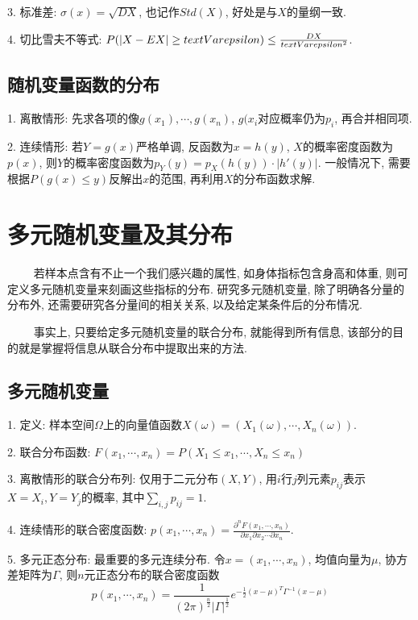 3. 标准差: $\sigma(x)=\sqrt{DX}$, 也记作$Std(X)$, 好处是与$X$的量纲一致.

4. 切比雪夫不等式: $P(|X-EX|\geq \\text{Var}epsilon)\leq \frac{DX}{\\text{Var}epsilon^2}$.

\subsection{随机变量函数的分布}

1. 离散情形: 先求各项的像$g(x_1),\cdots, g(x_n)$, $g(x_i$对应概率仍为$p_i$, 再合并相同项.

2. 连续情形: 若$Y=g(x)$严格单调, 反函数为$x=h(y)$, $X$的概率密度函数为$p(x)$, 则$Y$的概率密度函数为$p_Y(y)=p_X(h(y)) \cdot |h'(y)|$.
一般情况下, 需要根据$P(g(x)\leq y)$反解出$x$的范围, 再利用$X$的分布函数求解.

\section{多元随机变量及其分布}

\begin{tcolorbox}[colback=red!5,colframe=red!75!black]
    ~~~~ 若样本点含有不止一个我们感兴趣的属性, 如身体指标包含身高和体重, 则可定义多元随机变量来刻画这些指标的分布. 研究多元随机变量, 除了明确各分量的分布外, 还需要研究各分量间的相关关系, 以及给定某条件后的分布情况. 
    
    ~~~~ 事实上, 只要给定多元随机变量的联合分布, 就能得到所有信息, 该部分的目的就是掌握将信息从联合分布中提取出来的方法.
\end{tcolorbox}

\subsection{多元随机变量}

1. 定义: 样本空间$\Omega$上的向量值函数$X(\omega)=(X_1(\omega),\cdots,X_n(\omega))$.

2. 联合分布函数: $F(x_1,\cdots, x_n)=P(X_1\leq x_1, \cdots, X_n \leq x_n)$

3. 离散情形的联合分布列: 仅用于二元分布$(X,Y)$, 用$i$行$j$列元素$p_{ij}$表示$X=X_i,Y=Y_j$的概率, 其中$\sum\limits_{i,j}p_{ij}=1$.

4. 连续情形的联合密度函数: $p(x_1,\cdots, x_n)=\frac{\partial^nF(x_1,\cdots,x_n)}{\partial x_1\partial x_2 \cdots \partial x_n}$.

5. 多元正态分布: 最重要的多元连续分布. 令$x=(x_1,\cdots,x_n)$, 均值向量为$\mu$, 协方差矩阵为$\Gamma$, 则$n$元正态分布的联合密度函数
\begin{equation*}
    p(x_1,\cdots,x_n)=\frac{1}{(2\pi)^\frac{n}{2}|\Gamma|^\frac{1}{2}}e^{-\frac{1}{2}(x-\mu)^T\Gamma^{-1}(x-\mu)}
\end{equation*}

